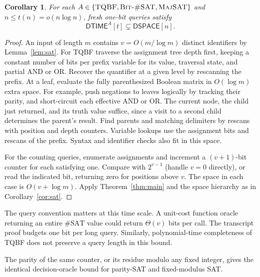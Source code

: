 \documentclass[11pt]{article}
\newtheorem{corollary}[theorem]{Corollary}
\theoremstyle{remark}
\newcommand{\DTIME}{\mathsf{DTIME}}
\newcommand{\DSPACE}{\mathsf{DSPACE}}
\begin{document}
\begin{corollary}
For each $A\in\{\textup{\textsc{TQBF}},\textup{\textsc{Bit-\#SAT}},\textup{\textsc{MajSAT}}\}$
and $n\le t(n)=o(n\log n)$, fresh one-bit queries satisfy
\[
 \DTIME^A[t]\subsetneq\DSPACE[n].
\]
\end{corollary}
\begin{proof}
An input of length $m$ contains $v=O(m/\log m)$ distinct identifiers
by Lemma~\ref{lem:sat}. For TQBF traverse the assignment tree depth
first, keeping a constant number of bits per prefix variable for its
value, traversal state, and partial AND or OR. Recover the quantifier
at a given level by rescanning the prefix. At a leaf, evaluate the
fully parenthesized Boolean matrix in $O(\log m)$ extra space. For
example, push negations to leaves logically by tracking their parity,
and short-circuit each effective AND or OR. The current node, the
child just returned, and its truth value suffice, since a visit to a
second child determines the parent's result. Find parents and
matching delimiters by rescans with position and depth counters.
Variable lookups use the assignment bits and rescans of the prefix.
Syntax and identifier checks also fit in this space.

For the counting queries, enumerate assignments and increment a
$(v+1)$-bit counter for each satisfying one. Compare with
$2^{v-1}$ (handle $v=0$ directly), or read the indicated bit,
returning zero for positions above $v$. The space in each case is
$O(v+\log m)$. Apply Theorem~\ref{thm:main} and the space hierarchy
as in Corollary~\ref{cor:sat}.
\end{proof}
The query convention matters at this time scale. A unit-cost
function oracle returning an entire $\#\mathrm{SAT}$ value could
return $\Theta(v)$ bits per call. The transcript proof budgets one
bit per long query. Similarly, polynomial-time completeness of TQBF
does not preserve a query length in this bound.

The parity of the same counter, or its residue modulo any fixed
integer, gives the identical decision-oracle bound for parity-SAT and
fixed-modulus SAT.
\end{document}
